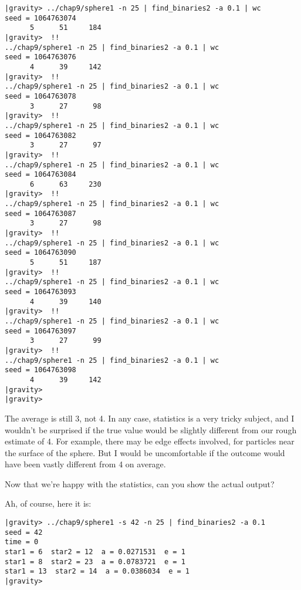 \begin{small}
\begin{verbatim}
|gravity> ../chap9/sphere1 -n 25 | find_binaries2 -a 0.1 | wc
seed = 1064763074
      5      51     184
|gravity>  !!
../chap9/sphere1 -n 25 | find_binaries2 -a 0.1 | wc
seed = 1064763076
      4      39     142
|gravity>  !!
../chap9/sphere1 -n 25 | find_binaries2 -a 0.1 | wc
seed = 1064763078
      3      27      98
|gravity>  !!
../chap9/sphere1 -n 25 | find_binaries2 -a 0.1 | wc
seed = 1064763082
      3      27      97
|gravity>  !!
../chap9/sphere1 -n 25 | find_binaries2 -a 0.1 | wc
seed = 1064763084
      6      63     230
|gravity>  !!
../chap9/sphere1 -n 25 | find_binaries2 -a 0.1 | wc
seed = 1064763087
      3      27      98
|gravity>  !!
../chap9/sphere1 -n 25 | find_binaries2 -a 0.1 | wc
seed = 1064763090
      5      51     187
|gravity>  !!
../chap9/sphere1 -n 25 | find_binaries2 -a 0.1 | wc
seed = 1064763093
      4      39     140
|gravity>  !!
../chap9/sphere1 -n 25 | find_binaries2 -a 0.1 | wc
seed = 1064763097
      3      27      99
|gravity>  !!
../chap9/sphere1 -n 25 | find_binaries2 -a 0.1 | wc
seed = 1064763098
      4      39     142
|gravity>  
|gravity> 
\end{verbatim}
\end{small}

\abc

\bob
The average is still 3, not 4.  In any case, statistics is a
very tricky subject, and I wouldn't be surprised if the true value
would be slightly different from our rough estimate of 4.  For example,
there may be edge effects involved, for particles near the surface of
the sphere.  But I would be uncomfortable if the outcome would have
been vastly different from 4 on average.

\alice
Now that we're happy with the statistics, can you show the actual output?

\bob
Ah, of course, here it is:

\cba

\begin{small}
\begin{verbatim}
|gravity> ../chap9/sphere1 -s 42 -n 25 | find_binaries2 -a 0.1
seed = 42
time = 0
star1 = 6  star2 = 12  a = 0.0271531  e = 1
star1 = 8  star2 = 23  a = 0.0783721  e = 1
star1 = 13  star2 = 14  a = 0.0386034  e = 1
|gravity> 
\end{verbatim}
\end{small}

\abc

